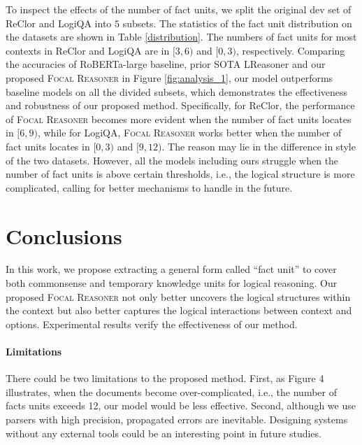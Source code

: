 \documentclass[11pt]{article}
\begin{document}
To inspect the effects of the number of fact units, we split the original dev set of ReClor and LogiQA into $5$ subsets. The statistics of the fact unit distribution on the datasets are shown in Table \ref{distribution}. The numbers of fact units for most contexts in ReClor and LogiQA are in $[3,6)$ and $[0,3)$, respectively. Comparing the accuracies of RoBERTa-large baseline, prior SOTA LReasoner and our proposed \textsc{Focal Reasoner} in Figure \ref{fig:analysis_1}, our model outperforms baseline models on all the divided subsets, which demonstrates the effectiveness and robustness of our proposed method. Specifically, for ReClor, the performance of \textsc{Focal Reasoner} becomes more evident when the number of fact units locates in $[6,9)$, while for LogiQA, \textsc{Focal Reasoner} works better when the number of fact units locates in $[0,3)$ and $[9,12)$. The reason may lie in the difference in style of the two datasets. However, all the models including ours struggle when the number of fact units is above certain thresholds, i.e., the logical structure is more complicated, calling for better mechanisms to handle in the future.





















\section{Conclusions}
In this work, we propose extracting a general form called ``fact unit'' to cover both commonsense and temporary knowledge units for logical reasoning. Our proposed \textsc{Focal Reasoner} not only better uncovers the logical structures within the context but also better captures the logical interactions between context and options. Experimental results verify the effectiveness of our method. 
\newpage

\paragraph{Limitations} There could be two limitations to the proposed method. First, as Figure 4 illustrates, when the documents become over-complicated, i.e., the number of facts units exceeds 12, our model would be less effective. Second, although we use parsers with high precision, propagated errors are inevitable. Designing systems without any external tools could be an interesting point in future studies.
\end{document}
